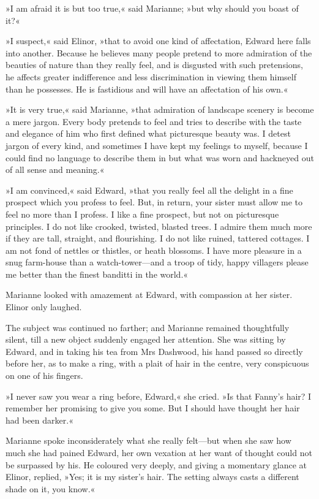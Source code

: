 »I am afraid it is but too true,« said Marianne; »but why should you boast of it?«

»I suspect,« said Elinor, »that to avoid one kind of affectation, Edward here falls into another. Because he believes many people pretend to more admiration of the beauties of nature than they really feel, and is disgusted with such pretensions, he affects greater indifference and less discrimination in viewing them himself than he possesses. He is fastidious and will have an affectation of his own.«

»It is very true,« said Marianne, »that admiration of landscape scenery is become a mere jargon. Every body pretends to feel and tries to describe with the taste and elegance of him who first defined what picturesque beauty was. I detest jargon of every kind, and sometimes I have kept my feelings to myself, because I could find no language to describe them in but what was worn and hackneyed out of all sense and meaning.«

»I am convinced,« said Edward, »that you really feel all the delight in a fine prospect which you profess to feel. But, in return, your sister must allow me to feel no more than I profess. I like a fine prospect, but not on picturesque principles. I do not like crooked, twisted, blasted trees. I admire them much more if they are tall, straight, and flourishing. I do not like ruined, tattered cottages. I am not fond of nettles or thistles, or heath blossoms. I have more pleasure in a snug farm-house than a watch-tower—and a troop of tidy, happy villagers please me better than the finest banditti in the world.«

Marianne looked with amazement at Edward, with compassion at her sister. Elinor only laughed.

The subject was continued no farther; and Marianne remained thoughtfully silent, till a new object suddenly engaged her attention. She was sitting by Edward, and in taking his tea from Mrs Dashwood, his hand passed so directly before her, as to make a ring, with a plait of hair in the centre, very conspicuous on one of his fingers.

»I never saw you wear a ring before, Edward,« she cried. »Is that Fanny’s hair? I remember her promising to give you some. But I should have thought her hair had been darker.«

Marianne spoke inconsiderately what she really felt—but when she saw how much she had pained Edward, her own vexation at her want of thought could not be surpassed by his. He coloured very deeply, and giving a momentary glance at Elinor, replied, »Yes; it is my sister’s hair. The setting always casts a different shade on it, you know.«


